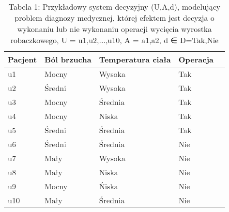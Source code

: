 \documentclass[a4paper]{article}
\begin{document}
\begin{table}[h]
\centering\caption{Tabela 1: Przykładowy system decyzyjny (U,A,d), modelujący problem diagnozy medycznej, której efektem jest decyzja o wykonaniu lub nie wykonaniu operacji wycięcia wyrostka robaczkowego, U = {u1,u2,...,u10}, A = {a1,a2}, d ∈ D={Tak,Nie}}
\begin{tabular}{l|llll}
\hline
\hline
Pacjent & Ból brzucha & Temperatura ciała & Operacja &  \\
\hline
u1      & Mocny       & Wysoka            & Tak      &  \\
u2      & Średni      & Wysoka            & Tak      &  \\
u3      & Mocny       & Średnia           & Tak       &  \\
u4      & Mocny       & Niska             & Tak       &  \\
u5      & Średni      & Średnia           & Tak       &  \\
u6      & Średni      & Średnia           & Nie       &  \\
u7      & Mały        & Wysoka            & Nie       &  \\
u8      & Mały        & Niska             & Nie       &  \\
u9      & Mocny       & Ńiska             & Nie       &  \\
u10     & Mały        & Średnia           & Nie       &  \\
\hline
\hline
\end{tabular}
\end{table}
\end{document}
